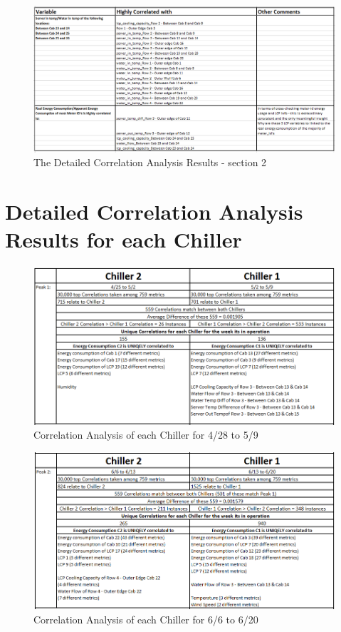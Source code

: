 \documentclass[12pt]{scrartcl}
\begin{document}
\begin{figure}[H]
  \caption{The Detailed Correlation Analysis Results - section 2}
  \label{fig:Correlation_Analysis_2}
  \centering
    \includegraphics[scale=0.50]{Correlation_Analysis_2}
\end{figure} 

\section{Detailed Correlation Analysis Results for each Chiller}
\label{sec:[Chiller Correlation Analysis Results]}

\begin{figure}[H]
  \caption{Correlation Analysis of each Chiller for 4/28 to 5/9}
  \label{fig:peak1chillercorrelation}
  \centering
    \includegraphics[scale=0.50]{peak1chillercorrelation}
\end{figure}   

\begin{figure}[H]
  \caption{Correlation Analysis of each Chiller for 6/6 to 6/20}
  \label{fig:peak2chillercorrelation}
  \centering
    \includegraphics[scale=0.50]{peak2chillercorrelation}
\end{figure}
\end{document}
